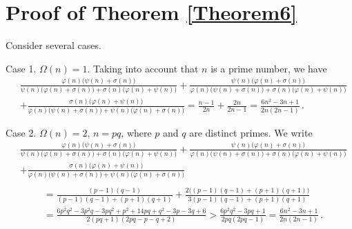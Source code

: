 \documentclass[12pt]{article}
\begin{document}
\section{Proof of Theorem \ref{Theorem6}}

Consider several cases.

Case 1. \; $\Omega(n)=1$. Taking into account that $n$ is a prime number, we have
\begin{align*}
&\frac{\varphi(n)\big(\psi(n)+\sigma(n)\big)}{\psi(n)\big(\varphi(n)+\sigma(n)\big)+\sigma(n)\big(\varphi(n)+\psi(n)\big)}
+\frac{\psi(n)\big(\varphi(n)+\sigma(n)\big)}{\varphi(n)\big(\psi(n)+\sigma(n)\big)+\sigma(n)\big(\varphi(n)+\psi(n)\big)}\\
&+\frac{\sigma(n)\big(\varphi(n)+\psi(n)\big)}{\varphi(n)\big(\psi(n)+\sigma(n)\big)+\psi(n)\big(\varphi(n)+\sigma(n)\big)}=\frac{n-1}{2n}+\frac{2n}{2n-1}=\frac{6n^2-3n+1}{2n(2n-1)}\,.
\end{align*}

Case 2. \; $\Omega(n)=2$, $n=pq$, where $p$ and $q$ are distinct primes. We write
\begin{align*}
&\frac{\varphi(n)\big(\psi(n)+\sigma(n)\big)}{\psi(n)\big(\varphi(n)+\sigma(n)\big)+\sigma(n)\big(\varphi(n)+\psi(n)\big)}
+\frac{\psi(n)\big(\varphi(n)+\sigma(n)\big)}{\varphi(n)\big(\psi(n)+\sigma(n)\big)+\sigma(n)\big(\varphi(n)+\psi(n)\big)}\\
&+\frac{\sigma(n)\big(\varphi(n)+\psi(n)\big)}{\varphi(n)\big(\psi(n)+\sigma(n)\big)+\psi(n)\big(\varphi(n)+\sigma(n)\big)}\\
\end{align*}
\begin{align*}
&=\frac{(p-1)(q-1)}{(p-1)(q-1)+(p+1)(q+1)}+\frac{2\big((p-1)(q-1)+(p+1)(q+1)\big)}{3(p-1)(q-1)+(p+1)(q+1)}\\ 
&=\frac{6p^2q^2-3p^2q-3pq^2+p^2+14pq+q^2-3p-3q+6}{2(pq+1)(2pq-p-q+2)}
>\frac{6p^2q^2-3pq+1}{2pq(2pq-1)}=\frac{6n^2-3n+1}{2n(2n-1)}\,.
\end{align*}
\end{document}
